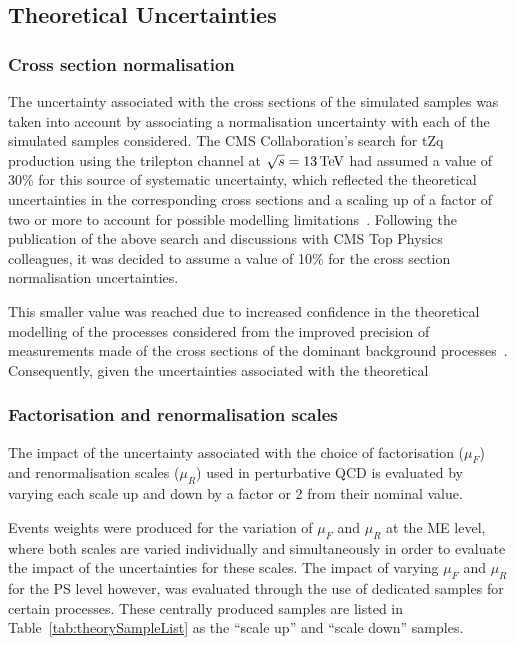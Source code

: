 \subsection{Theoretical Uncertainties}\label{sec:theorySysts}
\subsubsection{Cross section normalisation}
The uncertainty associated with the cross sections of the simulated samples was taken into account by associating a normalisation uncertainty with each of the simulated samples considered.
The CMS Collaboration's search for tZq production using the trilepton channel at $\sqrt{s} = 13\,\text{Te\hspace{-.08em}V}$ had assumed a value of 30\% for this source of systematic uncertainty, which reflected the theoretical uncertainties in the corresponding cross sections and a scaling up of a factor of two or more to account for possible modelling limitations~\cite{Sirunyan:2017nbr}.
Following the publication of the above search and discussions with CMS Top Physics colleagues, it was decided to assume a value of 10\% for the cross section normalisation uncertainties.

This smaller value was reached due to increased confidence in the theoretical modelling of the processes considered from the improved precision of measurements made of the cross sections of the dominant background processes~\cite{crossSectionSystematics,combineNick}.
Consequently, given the uncertainties associated with the  theoretical 


\subsubsection{Factorisation and renormalisation scales}
The impact of the uncertainty associated with the choice of factorisation ($\mu_{F}$) and renormalisation scales ($\mu_{R}$) used in perturbative QCD is evaluated by varying each scale up and down by a factor or 2 from their nominal value.

Events weights were produced for the variation of $\mu_{F}$ and $\mu_{R}$ at the ME level, where both scales are varied individually and simultaneously in order to evaluate the impact of the uncertainties for these scales.
The impact of varying $\mu_{F}$ and $\mu_{R}$ for the PS level however, was evaluated through the use of dedicated samples for certain processes.
These centrally produced samples are listed in Table~\ref{tab:theorySampleList} as the ``scale up'' and ``scale down'' samples. 

